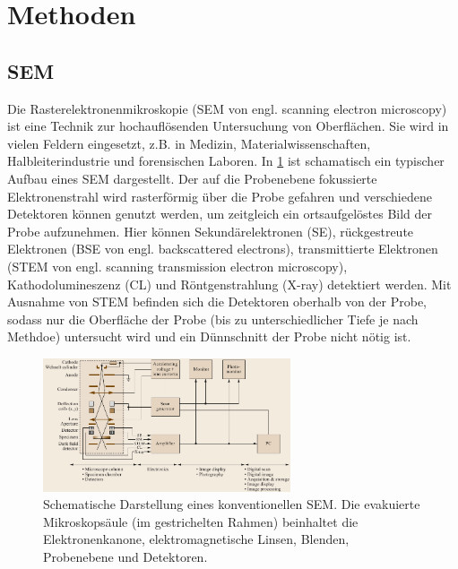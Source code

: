 \section{Methoden}


\subsection{SEM}

Die Rasterelektronenmikroskopie (SEM von engl. scanning electron microscopy) ist eine Technik zur hochauflösenden Untersuchung von Oberflächen.
Sie wird in vielen Feldern eingesetzt, z.B. in Medizin, Materialwissenschaften, Halbleiterindustrie und forensischen Laboren.
In \cref{fig:sem_schematic} ist schamatisch ein typischer Aufbau eines SEM dargestellt.
Der auf die Probenebene fokussierte Elektronenstrahl wird rasterförmig über die Probe gefahren und verschiedene Detektoren können genutzt werden, um zeitgleich ein ortsaufgelöstes Bild der Probe aufzunehmen.
Hier können Sekundärelektronen (SE), rückgestreute Elektronen (BSE von engl. backscattered electrons), transmittierte Elektronen (STEM von engl. scanning transmission electron microscopy), Kathodolumineszenz (CL) und Röntgenstrahlung (X-ray) detektiert werden. %
Mit Ausnahme von STEM befinden sich die Detektoren oberhalb von der Probe, sodass nur die Oberfläche der Probe (bis zu unterschiedlicher Tiefe je nach Methdoe) untersucht wird und ein Dünnschnitt der Probe nicht nötig ist.

\begin{figure}[!ht]
    \centering
    \includegraphics[width=0.65\textwidth]{img/sem_schematic}
    \caption{
    Schematische Darstellung eines konventionellen SEM.
    Die evakuierte Mikroskopsäule (im gestrichelten Rahmen) beinhaltet die Elektronenkanone, elektromagnetische Linsen, Blenden, Probenebene und Detektoren. \cite{springer-handbook}
    }
    \label{fig:sem_schematic}
\end{figure}

